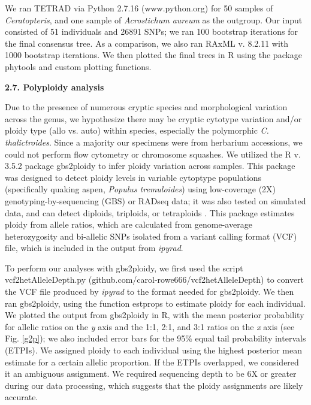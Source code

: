 \documentclass[12pt]{article}
\begin{document}
\begin{flushleft}
We ran {\small{TETRAD}} via Python 2.7.16 (www.python.org) for 50 samples of \textit{Ceratopteris}, and one sample of \textit{Acrostichum aureum} as the outgroup. Our input consisted of 51 individuals and 26891 SNPs; we ran 100 bootstrap iterations for the final consensus tree. As a comparison, we also ran {\small{RAxML}} v. 8.2.11 \autocite{Stamatakis2014} with 1000 bootstrap iterations. We then plotted the final trees in R using the package phytools \autocite{Revell2012} and custom plotting functions.

\textbf{2.7. Polyploidy analysis}

Due to the presence of numerous cryptic species and morphological variation across the genus, we hypothesize there may be cryptic cytotype variation and/or ploidy type (allo vs. auto) within species, especially the polymorphic \textit{C. thalictroides}. Since a majority our specimens were from herbarium accessions, we could not perform flow cytometry or chromosome squashes. We utilized the R v. 3.5.2 \autocite{R_352} package gbs2ploidy to infer ploidy variation across samples. This package was designed to detect ploidy levels in variable cytoptype populations (specifically quaking aspen, \textit{Populus tremuloides}) using low-coverage (2X) genotyping-by-sequencing (GBS) or RADseq data; it was also tested on simulated data, and can detect diploids, triploids, or tetraploids \autocite{Gompert2017}. This package estimates ploidy from allele ratios, which are calculated from genome-average heterozygosity and bi-allelic SNPs isolated from a variant calling format (VCF) file, which is included in the output from \textit{ipyrad}.

To perform our analyses with gbs2ploidy, we first used the script vcf2hetAlleleDepth.py (github.com/carol-rowe666/vcf2hetAlleleDepth) to convert the VCF file produced by \textit{ipyrad} to the format needed for gbs2ploidy. We then ran gbs2ploidy, using the function estprops to estimate ploidy for each individual. We plotted the output from gbs2ploidy in R, with the mean posterior probability for allelic ratios on the \textit{y} axis and the 1:1, 2:1, and 3:1 ratios on the \textit{x} axis (see Fig. \ref{g2p}); we also included error bars for the 95\% equal tail probability intervals (ETPIs). We assigned ploidy to each individual using the  highest posterior mean estimate for a certain allelic proportion. If the ETPIs overlapped, we considered it an ambiguous assignment. We required sequencing depth to be 6X or greater during our data processing, which suggests that the ploidy assignments are likely accurate.


\end{flushleft}
\end{document}
